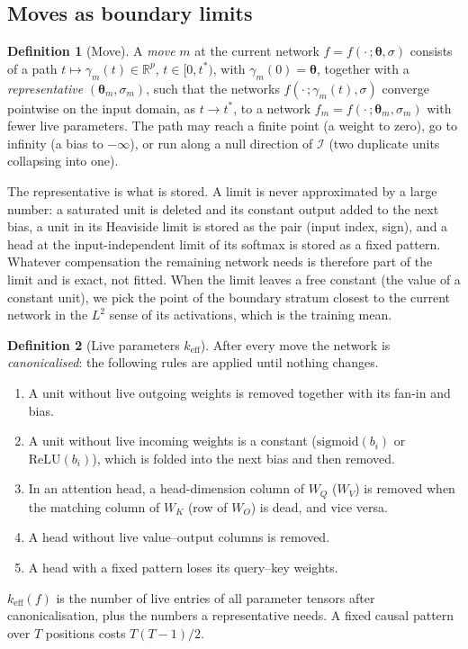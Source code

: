 \documentclass[11pt,a4paper]{article}
\theoremstyle{definition}
\newtheorem{definition}{Definition}
\newcommand{\R}{\mathbb{R}}
\newcommand{\bth}{\boldsymbol\theta}
\newcommand{\Fis}{\mathcal{I}}
\newcommand{\keff}{k_{\mathrm{eff}}}
\begin{document}
\subsection{Moves as boundary limits}
\label{sec:moves-def}

\begin{definition}[Move]
\label{def:move}
A \emph{move} $m$ at the current network $f=f(\cdot\,;\bth,\sigma)$ consists of a path
$t\mapsto\gamma_m(t)\in\R^{p}$, $t\in[0,t^\ast)$, with $\gamma_m(0)=\bth$, together with
a \emph{representative} $(\bth_m,\sigma_m)$, such that the networks
$f(\cdot\,;\gamma_m(t),\sigma)$ converge pointwise on the input domain, as $t\to t^\ast$,
to a network $f_m=f(\cdot\,;\bth_m,\sigma_m)$ with fewer live parameters. The path may
reach a finite point (a weight to zero), go to infinity (a bias to $-\infty$), or run
along a null direction of $\Fis$ (two duplicate units collapsing into one).
\end{definition}

The representative is what is stored. A limit is never approximated by a large number:
a saturated unit is deleted and its constant output added to the next bias, a unit in
its Heaviside limit is stored as the pair (input index, sign), and a head at the
input-independent limit of its softmax is stored as a fixed pattern. Whatever
compensation the remaining network needs is therefore part of the limit and is exact,
not fitted. When the limit leaves a free constant (the value of a constant unit), we
pick the point of the boundary stratum closest to the current network in the $L^2$
sense of its activations, which is the training mean.

\begin{definition}[Live parameters $\keff$]
\label{def:keff}
After every move the network is \emph{canonicalised}: the following rules are applied
until nothing changes.
\begin{enumerate}[label=(\roman*)]
\item A unit without live outgoing weights is removed together with its fan-in and bias.
\item A unit without live incoming weights is a constant ($\mathrm{sigmoid}(b_i)$ or
$\mathrm{ReLU}(b_i)$), which is folded into the next bias and then removed.
\item In an attention head, a head-dimension column of $W_Q$ ($W_V$) is removed when the
matching column of $W_K$ (row of $W_O$) is dead, and vice versa.
\item A head without live value--output columns is removed.
\item A head with a fixed pattern loses its query--key weights.
\end{enumerate}
$\keff(f)$ is the number of live entries of all parameter tensors after
canonicalisation, plus the numbers a representative needs. A fixed causal pattern over
$T$ positions costs $T(T-1)/2$.
\end{definition}
\end{document}
